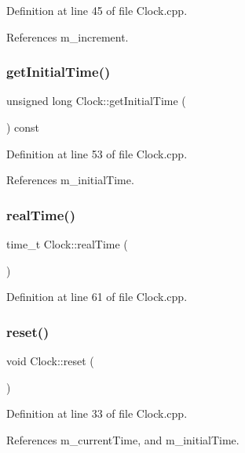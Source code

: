 Definition at line 45 of file Clock.\+cpp.



References m\+\_\+increment.

\mbox{\label{class_clock_a9792f62fed3c320abecc5c455b13a804}} 
\subsubsection{getInitialTime()}
{\footnotesize\ttfamily unsigned long Clock\+::get\+Initial\+Time (\begin{DoxyParamCaption}{ }\end{DoxyParamCaption}) const}



Definition at line 53 of file Clock.\+cpp.



References m\+\_\+initial\+Time.

\mbox{\label{class_clock_a29512d39298cafed334d0c01da70ea7b}} 
\subsubsection{realTime()}
{\footnotesize\ttfamily time\+\_\+t Clock\+::real\+Time (\begin{DoxyParamCaption}{ }\end{DoxyParamCaption})}



Definition at line 61 of file Clock.\+cpp.

\mbox{\label{class_clock_a0ab5423b0a997aa13d7b6131c46d1358}} 
\subsubsection{reset()}
{\footnotesize\ttfamily void Clock\+::reset (\begin{DoxyParamCaption}{ }\end{DoxyParamCaption})}



Definition at line 33 of file Clock.\+cpp.



References m\+\_\+current\+Time, and m\+\_\+initial\+Time.

\mbox{\label{class_clock_a7046e8733ab749d3c24b3c61bd108d6c}} 
